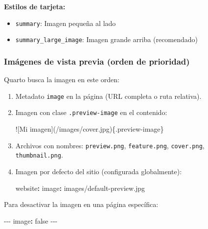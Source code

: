 \documentclass[
  doc,
  floatsintext,
  longtable,
  a4paper,
  nolmodern,
  notxfonts,
  notimes,
  12pt,
  colorlinks=true,linkcolor=blue,citecolor=blue,urlcolor=blue]{apa7}
\newenvironment{Shaded}{\begin{snugshade}}{\end{snugshade}}
\newcommand{\AlertTok}[1]{\textcolor[rgb]{0.68,0.00,0.00}{#1}}
\newcommand{\AttributeTok}[1]{\textcolor[rgb]{0.40,0.45,0.13}{#1}}
\newcommand{\CharTok}[1]{\textcolor[rgb]{0.13,0.47,0.30}{#1}}
\newcommand{\FunctionTok}[1]{\textcolor[rgb]{0.28,0.35,0.67}{#1}}
\newcommand{\KeywordTok}[1]{\textcolor[rgb]{0.00,0.23,0.31}{\textbf{#1}}}
\newcommand{\NormalTok}[1]{\textcolor[rgb]{0.00,0.23,0.31}{#1}}
\newcommand{\PreprocessorTok}[1]{\textcolor[rgb]{0.68,0.00,0.00}{#1}}
\providecommand{\tightlist}{%
  \setlength{\itemsep}{0pt}\setlength{\parskip}{0pt}}
\begin{document}
\textbf{Estilos de tarjeta:}

\begin{itemize}
\tightlist
\item
  \texttt{summary}: Imagen pequeña al lado
\item
  \texttt{summary\_large\_image}: Imagen grande arriba (recomendado)
\end{itemize}

\subsubsection{Imágenes de vista previa (orden de
prioridad)}\label{imuxe1genes-de-vista-previa-orden-de-prioridad-1}

Quarto busca la imagen en este orden:

\begin{enumerate}
\def\labelenumi{\arabic{enumi}.}
\item
  Metadato \texttt{image} en la página (URL completa o ruta relativa).
\item
  Imagen con clase \texttt{.preview-image} en el contenido:

\begin{Shaded}
\begin{Highlighting}[]
\AlertTok{![Mi imagen](/images/cover.jpg)}\NormalTok{\{.preview{-}image\}}
\end{Highlighting}
\end{Shaded}
\item
  Archivos con nombres: \texttt{preview.png}, \texttt{feature.png},
  \texttt{cover.png}, \texttt{thumbnail.png}.
\item
  Imagen por defecto del sitio (configurada globalmente):

\begin{Shaded}
\begin{Highlighting}[]
\FunctionTok{website}\KeywordTok{:}
\AttributeTok{  }\FunctionTok{image}\KeywordTok{:}\AttributeTok{ images/default{-}preview.jpg}
\end{Highlighting}
\end{Shaded}
\end{enumerate}

Para desactivar la imagen en una página específica:

\begin{Shaded}
\begin{Highlighting}[]
\PreprocessorTok{{-}{-}{-}}
\FunctionTok{image}\KeywordTok{:}\AttributeTok{ }\CharTok{false}
\PreprocessorTok{{-}{-}{-}}
\end{Highlighting}
\end{Shaded}
\end{document}

